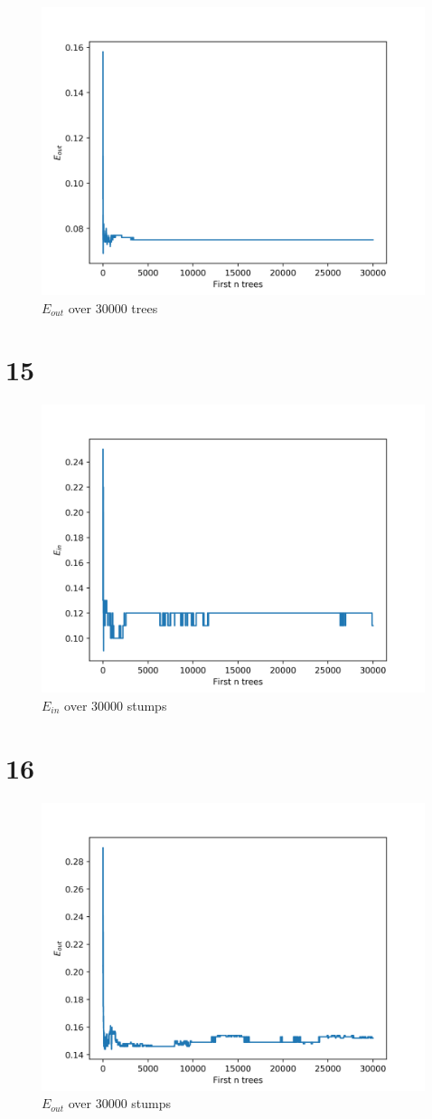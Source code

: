 \documentclass[fleqn,a4paper,12pt]{article}
\begin{document}
\begin{figure}[H]
\centering
\includegraphics[width=0.75\linewidth]{tree-eout.png}
\caption{$E_{out}$ over 30000 trees}
\label{fig:tree-eout}
\end{figure}

\section*{15}

\begin{figure}[H]
\centering
\includegraphics[width=0.75\linewidth]{stump-ein.png}
\caption{$E_{in}$ over 30000 stumps}
\label{fig:stump-ein}
\end{figure}

\section*{16}

\begin{figure}[H]
\centering
\includegraphics[width=0.75\linewidth]{stump-eout.png}
\caption{$E_{out}$ over 30000 stumps}
\label{fig:stump-eout}
\end{figure}
\end{document}
